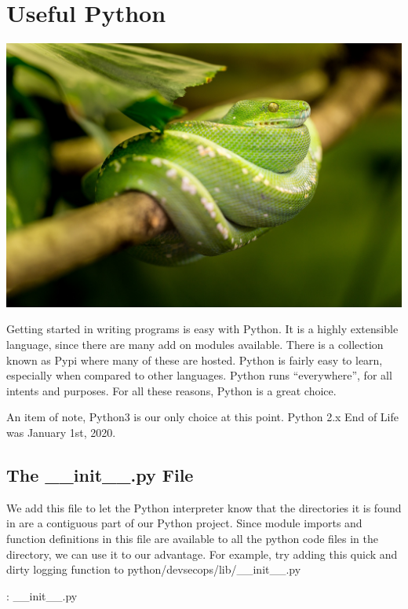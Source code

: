 \chapter{Useful Python}

\includegraphics[scale=0.85]{../images/snake-1634293_1920.jpg}

\justify{}
Getting started in writing programs is easy with Python. It is a highly 
extensible language, since there are many add on modules available. 
There is a collection known as Pypi where many of these are hosted.
Python is fairly easy to learn, especially when compared to other languages.
Python runs ``everywhere'', for all intents and purposes. For all these reasons,
Python is a great choice.

\justify{}
An item of note, Python3 is our only choice at this point. Python 2.x End of Life was
January 1st, 2020.

\section{The \_\_init\_\_.py File}

\justify{}
We add this file to let the Python interpreter know that the directories
it is found in are a contiguous part of our Python project. Since module
imports and function definitions in this file are available to all the
python code files in the directory, we can use it to our advantage. For
example, try adding this quick and dirty logging function to
python/devsecops/lib/\_\_init\_\_.py

\justify{}
\begin{mybox}{\thetcbcounter: \_\_init\_\_.py}
  
\end{mybox}

